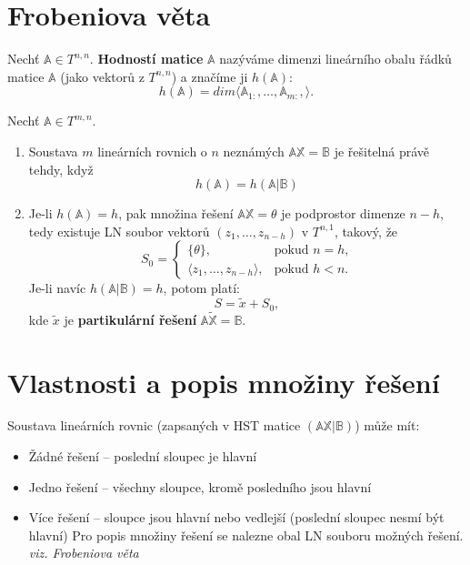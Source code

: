 \documentclass{szzclass}
\begin{document}
\section{Frobeniova věta}
\begin{definition}
Nechť $\mathbb{A}\in T^{n,n}$. \textbf{Hodností matice} $\mathbb{A}$ nazýváme dimenzi lineárního obalu řádků matice $\mathbb{A}$ (jako vektorů z $T^{n,n}$) a značíme ji $h(\mathbb{A})$:
\begin{equation}
  h(\mathbb{A})=dim\langle \mathbb{A}_{1:},\dots,\mathbb{A}_{m:},\rangle.
\end{equation}
\end{definition}

\begin{theorem}
Nechť $\mathbb{A}\in T^{m,n}$.
\begin{enumerate}
\item Soustava $m$ lineárních rovnich o $n$ neznámých $\mathbb{A} \mathbb{X}=\mathbb{B}$ je řešitelná právě tehdy, když
$$
h(\mathbb{A})=h(\mathbb{A} | \mathbb{B})
$$
\item Je-li $h(\mathbb{A})=h$, pak množina řešení $\mathbb{A} \mathbb{X}=\theta$ je podprostor dimenze $n-h$, tedy existuje LN soubor vektorů $(z_1,\dots,z_{n-h})$ v $T^{n,1}$, takový, že
$$ S_0=\begin{cases}
       \{\theta\}, & \text{pokud $n=h$,} \\
       \langle z_1,\dots,z_{n-h}\rangle, & \text{pokud $h<n$.}
       \end{cases}
$$
Je-li navíc $h(\mathbb{A}|\mathbb{B})=h$, potom platí:
$$
S=\widetilde{x} + S_0,
$$ kde $\widetilde{x}$ je \textbf{partikulární řešení} $\mathbb{A} \widetilde{\mathbb{X}}=\mathbb{B}$.
\end{enumerate}
\end{theorem}

\section{Vlastnosti a popis množiny řešení}
Soustava lineárních rovnic (zapsaných v HST matice $(\mathbb{A}\mathbb{X}|\mathbb{B})$) může mít:
\begin{itemize}
\item Žádné řešení -- poslední sloupec je hlavní
\item Jedno řešení -- všechny sloupce, kromě posledního jsou hlavní
\item Více řešení -- sloupce jsou hlavní nebo vedlejší (poslední sloupec nesmí být hlavní)
Pro popis množiny řešení se nalezne obal LN souboru možných řešení. \emph{viz. Frobeniova věta}
\end{itemize}
\end{document}
